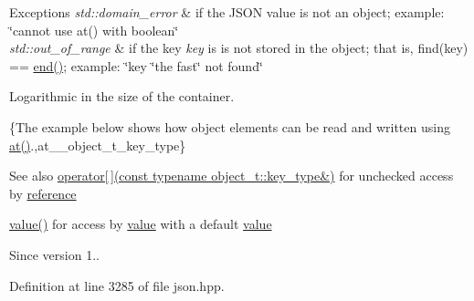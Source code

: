 \begin{DoxyExceptions}{Exceptions}
{\em std\+::domain\+\_\+error} & if the J\+S\+O\+N value is not an object; example\+: {\ttfamily \char`\"{}cannot use at() with boolean\char`\"{}} \\
\hline
{\em std\+::out\+\_\+of\+\_\+range} & if the key {\itshape key} is is not stored in the object; that is, {\ttfamily find(key) == \hyperlink{classnlohmann_1_1basic__json_a12ccf14d39ddae52f6c7e126105a230b}{end()}}; example\+: {\ttfamily \char`\"{}key \char`\"{}the fast\char`\"{} not found\char`\"{}}\\
\hline
\end{DoxyExceptions}
Logarithmic in the size of the container.

\{The example below shows how object elements can be read and written using {\ttfamily \hyperlink{classnlohmann_1_1basic__json_a214a8c22d616fd3567b88932c07436c9}{at()}}.,at\+\_\+\+\_\+object\+\_\+t\+\_\+key\+\_\+type\}

\begin{DoxySeeAlso}{See also}
\hyperlink{classnlohmann_1_1basic__json_a92fbb711a36b5ce78ee228b26787c034}{operator\mbox{[}$\,$\mbox{]}(const typename object\+\_\+t\+::key\+\_\+type\&)} for unchecked access by \hyperlink{classnlohmann_1_1basic__json_a3ec8e17be8732fe436e9d6733f52b7a3}{reference} 

\hyperlink{classnlohmann_1_1basic__json_a0a2cbbd95862a623e7dc5c37e67dead0}{value()} for access by \hyperlink{classnlohmann_1_1basic__json_a0a2cbbd95862a623e7dc5c37e67dead0}{value} with a default \hyperlink{classnlohmann_1_1basic__json_a0a2cbbd95862a623e7dc5c37e67dead0}{value}
\end{DoxySeeAlso}
\begin{DoxySince}{Since}
version 1.. 
\end{DoxySince}


Definition at line 3285 of file json.\+hpp.

\hypertarget{classnlohmann_1_1basic__json_a674de1ee73e6bf4843fc5dc1351fb726}{}
